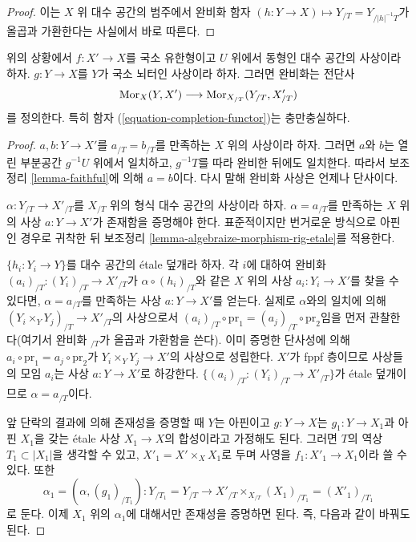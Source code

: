 \begin{proof}
이는 $X$ 위 대수 공간의 범주에서 완비화 함자
$(h : Y \to X) \mapsto Y_{/T} = Y_{/|h|^{-1}T}$가
올곱과 가환한다는 사실에서 바로 따른다.
\end{proof}

\begin{lemma}
\label{lemma-completion-functor-fully-faithful}
위의 상황에서 $f : X' \to X$를 국소 유한형이고
$U$ 위에서 동형인 대수 공간의 사상이라 하자.
$g : Y \to X$를 $Y$가 국소 뇌터인 사상이라 하자.
그러면 완비화는 전단사
$$
\mathop{\mathrm{Mor}}\nolimits_X(Y, X') \longrightarrow \mathop{\mathrm{Mor}}\nolimits_{X_{/T}}(Y_{/T}, X'_{/T})
$$
를 정의한다. 특히 함자 (\ref{equation-completion-functor})는
충만충실하다.
\end{lemma}

\begin{proof}
$a, b : Y \to X'$를 $a_{/T} = b_{/T}$를 만족하는
$X$ 위의 사상이라 하자. 그러면 $a$와 $b$는 열린 부분공간
$g^{-1}U$ 위에서 일치하고, $g^{-1}T$를 따라 완비한 뒤에도 일치한다.
따라서 보조정리 \ref{lemma-faithful}에 의해 $a = b$이다.
다시 말해 완비화 사상은 언제나 단사이다.

\medskip\noindent
$\alpha : Y_{/T} \to X'_{/T}$를 $X_{/T}$ 위의 형식 대수 공간의
사상이라 하자. $\alpha = a_{/T}$를 만족하는 $X$ 위의 사상
$a : Y \to X'$가 존재함을 증명해야 한다.
표준적이지만 번거로운 방식으로 아핀인 경우로 귀착한 뒤
보조정리 \ref{lemma-algebraize-morphism-rig-etale}를 적용한다.

\medskip\noindent
$\{h_i : Y_i \to Y\}$를 대수 공간의 \'etale 덮개라 하자.
각 $i$에 대하여 완비화
$(a_i)_{/T} : (Y_i)_{/T} \to X'_{/T}$가
$\alpha \circ (h_i)_{/T}$와 같은 $X$ 위의 사상
$a_i : Y_i \to X'$를 찾을 수 있다면,
$\alpha = a_{/T}$를 만족하는 사상 $a : Y \to X'$를 얻는다.
실제로 $\alpha$와의 일치에 의해
$(Y_i \times_Y Y_j)_{/T} \to X'_{/T}$의 사상으로서
$(a_i)_{/T} \circ \text{pr}_1 = (a_j)_{/T} \circ \text{pr}_2$임을
먼저 관찰한다(여기서 완비화 $ {}_{/T}$가 올곱과 가환함을 쓴다).
이미 증명한 단사성에 의해
$a_i \circ \text{pr}_1 = a_j \circ \text{pr}_2$가
$Y_i \times_Y Y_j \to X'$의 사상으로 성립한다.
$X'$가 fppf 층이므로 사상들의 모임 $a_i$는
사상 $a : Y \to X'$로 하강한다.
$\{(a_i)_{/T} : (Y_i)_{/T} \to X'_{/T}\}$가
\'etale 덮개이므로 $\alpha = a_{/T}$이다.

\medskip\noindent
앞 단락의 결과에 의해 존재성을 증명할 때
$Y$는 아핀이고 $g : Y \to X$는 $g_1 : Y \to X_1$과
아핀 $X_1$을 갖는 \'etale 사상 $X_1 \to X$의 합성이라고
가정해도 된다. 그러면 $T$의 역상
$T_1 \subset |X_1|$을 생각할 수 있고,
$X'_1 = X' \times_X X_1$로 두며 사영을
$f_1 : X'_1 \to X_1$이라 쓸 수 있다. 또한
$$
\alpha_1 = (\alpha, (g_1)_{/T_1}) :
Y_{/T_1} = Y_{/T}
\longrightarrow
X'_{/T} \times_{X_{/T}} (X_1)_{/T_1} = (X'_1)_{/T_1}
$$
로 둔다. 이제 $X_1$ 위의 $\alpha_1$에 대해서만 존재성을 증명하면 된다.
즉, 다음과 같이 바꿔도 된다.


\end{proof}
